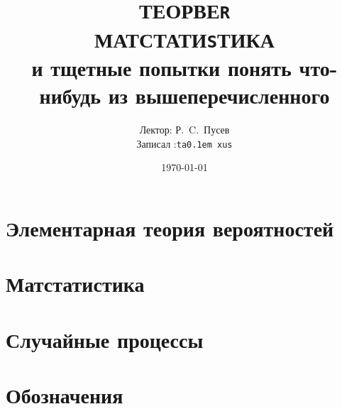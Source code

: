 \documentclass[12pt,ebook]{../notes}
\title{ТЕОРВЕ{\tt R} \\
  МАТСТАТИ{\tt S}ТИКА\\
  и тщетные попытки понять что-нибудь из вышеперечисленного
}
\date{\today}
\author{Лектор: Р.~C.~Пусев \\
Записал :\texttt{ta\lower 0.1em \hbox{x}us}}
\begin{document}
 
\maketitle
\tableofcontents
\clearpage

\chapter{Элементарная теория вероятностей}

\chapter{Матстатистика}

\chapter{Случайные процессы}


\clearpage

\appendix
\chapter{Обозначения}






\end{document}
